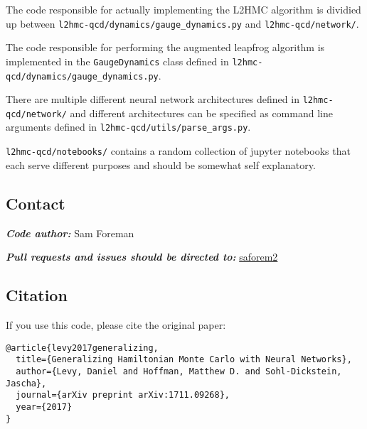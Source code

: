 The code responsible for actually implementing the L2HMC algorithm is
dividied up between \texttt{l2hmc-qcd/dynamics/gauge\_dynamics.py} and
\texttt{l2hmc-qcd/network/}.

The code responsible for performing the augmented leapfrog algorithm is
implemented in the \texttt{GaugeDynamics} class defined in
\texttt{l2hmc-qcd/dynamics/gauge\_dynamics.py}.

There are multiple different neural network architectures defined in
\texttt{l2hmc-qcd/network/} and different architectures can be specified
as command line arguments defined in
\texttt{l2hmc-qcd/utils/parse\_args.py}.

\texttt{l2hmc-qcd/notebooks/} contains a random collection of jupyter
notebooks that each serve different purposes and should be somewhat self
explanatory.

\hypertarget{contact}{%
\subsection{Contact}\label{contact}}

\textbf{\emph{Code author:}} Sam Foreman

\textbf{\emph{Pull requests and issues should be directed to:}}
\href{http://github.com/saforem2}{saforem2}

\hypertarget{citation}{%
\subsection{Citation}\label{citation}}

If you use this code, please cite the original paper:

\begin{verbatim}
@article{levy2017generalizing,
  title={Generalizing Hamiltonian Monte Carlo with Neural Networks},
  author={Levy, Daniel and Hoffman, Matthew D. and Sohl-Dickstein, Jascha},
  journal={arXiv preprint arXiv:1711.09268},
  year={2017}
}
\end{verbatim}
